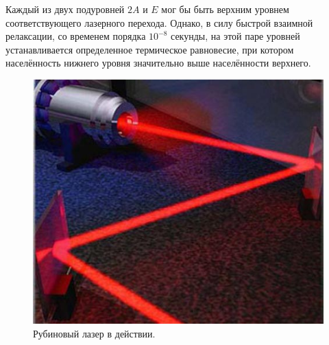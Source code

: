 \documentclass[a4paper,12pt]{article}
\theoremstyle{plain} %
\theoremstyle{definition} %
\theoremstyle{remark} %
\begin{document}
  Каждый из двух подуровней $2A$ и $E$   мог бы быть верхним уровнем соответствующего лазерного перехода. Однако, в силу быстрой взаимной релаксации, со временем порядка $10^{-8}$ секунды, на этой паре уровней устанавливается определенное термическое равновесие, при котором населённость нижнего уровня 
 значительно выше населённости верхнего.
 
\begin{figure}[h!]
	\centering
	\includegraphics[scale=2]{pict4.png}
	\caption{Рубиновый лазер в действии.}
	\label{fig:2sistem3}
\end{figure}
\end{document}
